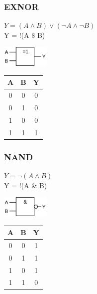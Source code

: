 \subsubsection{EXNOR}
\begin{center}
    \begin{minipage}{0.55\linewidth}
		$Y = (A \land B) \lor (\neg A \land \neg B)$\\
		Y = !(A \$ B)
        \begin{center}
		\includegraphics[height = 10mm]{images/xor.png}		
        \end{center}
    \end{minipage}
    \hfill
    \begin{minipage}{0.35\linewidth}
	\begin{tabular}{|c c|c|}
            \hline
            A & B & Y\\
            \hline
            0 & 0 & 0\\
            0 & 1 & 0\\
            1 & 0 & 0\\
	    1 & 1 & 1\\
            \hline
  	  \end{tabular}
    \end{minipage}
\end{center}

\subsubsection{NAND}
\begin{center}
    \begin{minipage}{0.55\linewidth}
		$Y = \neg(A \land B)$\\
		Y = !(A \& B)
        \begin{center}
		\includegraphics[height = 10mm]{images/nand.png}		
        \end{center}
    \end{minipage}
    \hfill
    \begin{minipage}{0.35\linewidth}
	\begin{tabular}{|c c|c|}
            \hline
            A & B & Y\\
            \hline
            0 & 0 & 1\\
            0 & 1 & 1\\
            1 & 0 & 1\\
	    1 & 1 & 0\\
            \hline
  	  \end{tabular}
    \end{minipage}
\end{center}

